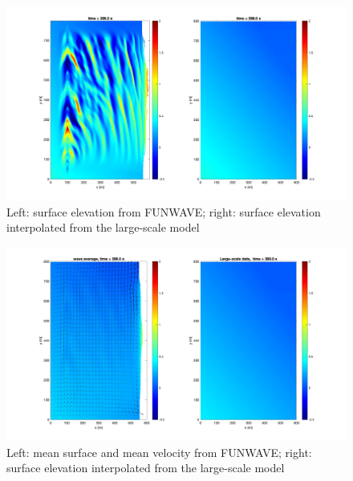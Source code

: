 \documentclass[preprint,10pt]{elsarticle}
\begin{document}
 \begin{figure}
\begin{center}
 \includegraphics[width=1.0\textwidth]{figures/elevation_view.jpg}
 \caption{Left: surface elevation from FUNWAVE; right: surface elevation interpolated from the large-scale model }
 \label{surface}
 \end{center}
 \end{figure}  
  
  \begin{figure}
\begin{center}
 \includegraphics[width=1.0\textwidth]{figures/uvmean_view.jpg}
 \caption{Left: mean surface and mean velocity from FUNWAVE; right: surface elevation interpolated from the large-scale model }
 \label{mean}
 \end{center}
 \end{figure}  
  
\end{document}
